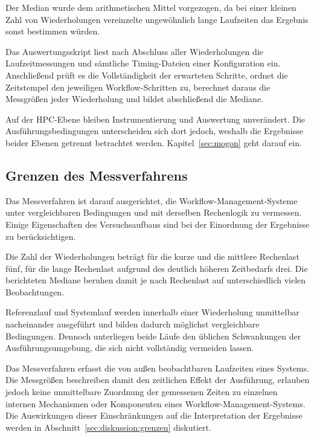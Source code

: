 Der Median wurde dem arithmetischen Mittel vorgezogen, da bei einer
kleinen Zahl von Wiederholungen vereinzelte ungewöhnlich lange
Laufzeiten das Ergebnis sonst bestimmen würden.

Das Auswertungsskript liest nach Abschluss aller Wiederholungen die
Laufzeitmessungen und sämtliche Timing-Dateien einer Konfiguration
ein. Anschließend prüft es die Vollständigkeit der erwarteten
Schritte, ordnet die Zeitstempel den jeweiligen Workflow-Schritten
zu, berechnet daraus die Messgrößen jeder Wiederholung und bildet
abschließend die Mediane.

Auf der HPC-Ebene bleiben Instrumentierung und Auswertung
unverändert. Die Ausführungsbedingungen unterscheiden sich dort
jedoch, weshalb die Ergebnisse beider Ebenen getrennt betrachtet
werden. Kapitel~\ref{sec:mogon} geht darauf ein.

\subsection{Grenzen des Messverfahrens}
\label{sec:methodik:grenzen}

Das Messverfahren ist darauf ausgerichtet, die
Workflow-Management-Systeme unter vergleichbaren Bedingungen und
mit derselben Rechenlogik zu vermessen. Einige Eigenschaften des
Versuchsaufbaus sind bei der Einordnung der Ergebnisse zu
berücksichtigen.

Die Zahl der Wiederholungen beträgt für die kurze und die mittlere
Rechenlast fünf, für die lange Rechenlast aufgrund des deutlich
höheren Zeitbedarfs drei. Die berichteten Mediane beruhen damit je
nach Rechenlast auf unterschiedlich vielen Beobachtungen.

Referenzlauf und Systemlauf werden innerhalb einer Wiederholung
unmittelbar nacheinander ausgeführt und bilden dadurch möglichst
vergleichbare Bedingungen. Dennoch unterliegen beide Läufe den
üblichen Schwankungen der Ausführungsumgebung, die sich nicht
vollständig vermeiden lassen.

Das Messverfahren erfasst die von außen beobachtbaren Laufzeiten
eines Systems. Die Messgrößen beschreiben damit den zeitlichen
Effekt der Ausführung, erlauben jedoch keine unmittelbare Zuordnung
der gemessenen Zeiten zu einzelnen internen Mechanismen oder
Komponenten eines Workflow-Management-Systems. Die Auswirkungen
dieser Einschränkungen auf die Interpretation der Ergebnisse werden
in Abschnitt~\ref{sec:diskussion:grenzen} diskutiert.